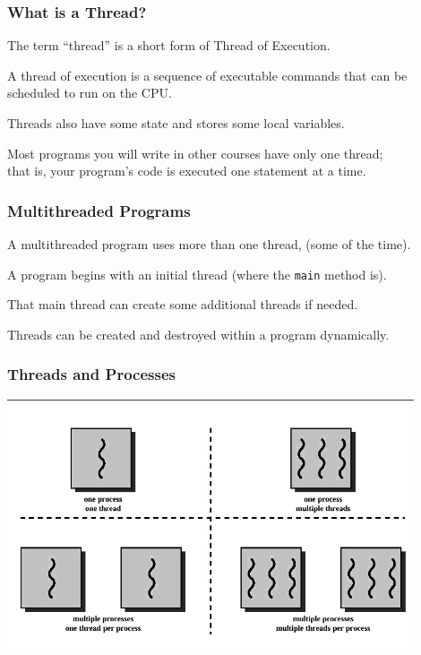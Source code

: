 \begin{frame}
	\frametitle{What is a Thread?}

	The term ``thread'' is a short form of \alert{Thread of Execution}.

	A thread of execution is a sequence of executable commands that can be scheduled to run on the CPU.

	Threads also have some state and stores some local variables.

	Most programs you will write in other courses have only one thread;\\
	\quad that is, your program's code is executed one statement at a time.

\end{frame}

\begin{frame}
	\frametitle{Multithreaded Programs}

	A multithreaded program uses more than one thread, (some of the time).

	A program begins with an initial thread (where the \texttt{main} method is).

	That main thread can create some additional threads if needed.

	Threads can be created and destroyed within a program dynamically.

\end{frame}

\begin{frame}
	\frametitle{Threads and Processes}

	\begin{center}
		\includegraphics[width=0.9\textwidth]{images/mthread.png}
	\end{center}

\end{frame}

